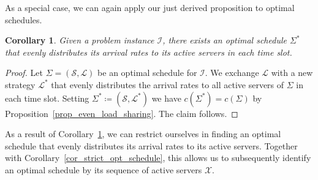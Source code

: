\documentclass[hidelinks]{article}
\theoremstyle{plain}
\newtheorem{cor}[thm]{Corollary}
\theoremstyle{definition}
\theoremstyle{rem}
\newcommand{\mx}{\mathcal{X}}
\newcommand{\inp}{\mathcal{I}}
\newcommand{\costs}{c}
\begin{document}
As a special case, we can again apply our just derived proposition to optimal schedules.
\begin{cor}\label{cor_even_load_sharing}
Given a problem instance $\inp$, there exists an optimal schedule $\Sigma^*$ that evenly distributes its arrival rates to its active servers in each time slot.
\end{cor}
\begin{proof}
Let $\Sigma=(\mathcal{S},\mathcal{L})$ be an optimal schedule for $\inp$. We exchange $\mathcal{L}$ with a new strategy $\mathcal{L}^*$ that evenly distributes the arrival rates to all active servers of $\Sigma$ in each time slot. Setting $\Sigma^*\coloneqq(\mathcal{S},\mathcal{L}^*)$ we have $\costs(\Sigma^*)=\costs(\Sigma)$ by Proposition~\ref{prop_even_load_sharing}. The claim follows.
\end{proof}
As a result of Corollary~\ref{cor_even_load_sharing}, we can restrict ourselves in finding an optimal schedule that evenly distributes its arrival rates to its active servers. Together with Corollary~\ref{cor_strict_opt_schedule}, this allows us to subsequently identify an optimal schedule by its sequence of active servers $\mx$. 
\end{document}
